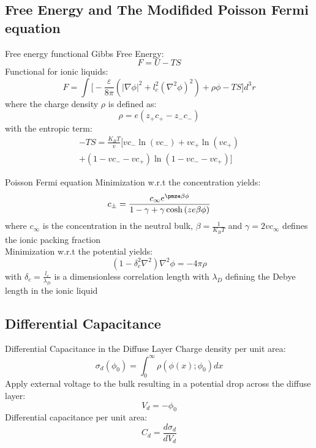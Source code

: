 \documentclass{beamer}
\begin{document}
\subsection{Free Energy and The Modifided Poisson Fermi equation}

\begin{frame}{Free energy functional}
Gibbs Free Energy:
$$F = U - TS$$
Functional for ionic liquids:
$$ F = \int \bigg[ -\frac{\varepsilon}{8\pi}(|\nabla \phi |^2 +l_c^2(\nabla^2 \phi)^2) +\rho \phi -TS \bigg] d^3r $$
where the charge density $\rho$ is defined as:
$$\rho = e(z_+c_+ - z_-c_-)$$
with the entropic term:
\begin{multline*}
-TS = \frac{K_BT}{v}[vc_- \ln{(vc_- )} + vc_+ \ln{(vc_+)} \\+ (1 -vc_- - vc_+)\ln{(1 - vc_- -vc_+)}]
\end{multline*}
\end{frame}

\begin{frame}{Poisson Fermi equation}
Minimization w.r.t the concentration yields:
$$c_{\pm} = \frac{c_{\infty}e^{\pmze\beta\phi}}{1 - \gamma + \gamma \cosh{(ze\beta\phi)}} $$
where $c_{\infty}$ is the concentration in the neutral bulk, $\beta = \frac{1}{K_BT}$ and $\gamma = 2vc_{\infty}$ defines the ionic packing fraction\\
\vspace{1em}
Minimization w.r.t the potential yields:
$$(1 - \delta_c^2 \nabla^2)\nabla^2 \phi = -4\pi\rho$$
with $\delta_c = \frac{l_c}{\lambda_D}$ is a dimensionless correlation length with $\lambda_D$ defining the Debye length in the ionic liquid
\end{frame}

\subsection{Differential Capacitance}
\begin{frame}{Differential Capacitance in the Diffuse Layer}
Charge density per unit area:
    $$\sigma_d(\phi_0) = \int^\infty_0 \rho(\phi(x);\phi_0)dx $$
    Apply external voltage to the bulk resulting in a potential drop across the diffuse layer:
    $$V_d = -\phi_0$$
    Differential capacitance per unit area:
    $$C_d = \frac{d\sigma_d}{dV_d}$$
\end{frame}{}
\end{document}
